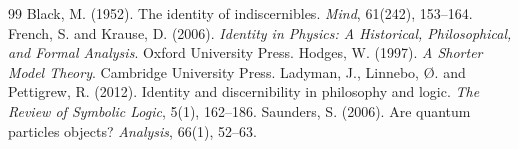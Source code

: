 \documentclass{situationist-preprint}
\begin{document}
\begin{thebibliography}{99}\small
{} Black, M. (1952). The identity of indiscernibles. \emph{Mind}, 61(242), 153--164.
 French, S. and Krause, D. (2006). \emph{Identity in Physics: A Historical, Philosophical, and Formal Analysis}. Oxford University Press.
 Hodges, W. (1997). \emph{A Shorter Model Theory}. Cambridge University Press.
 Ladyman, J., Linnebo, {\O}. and Pettigrew, R. (2012). Identity and discernibility in philosophy and logic. \emph{The Review of Symbolic Logic}, 5(1), 162--186.
 Saunders, S. (2006). Are quantum particles objects? \emph{Analysis}, 66(1), 52--63.
\end{thebibliography}
\end{document}

